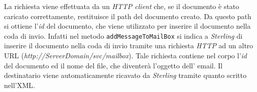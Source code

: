 La richiesta viene effettuata da un \textit{HTTP client} che, se il documento è stato caricato correttamente, restituisce il path del documento creato.
Da questo path si ottiene l'\textit{id} del documento, che viene utilizzato per inserire il documento nella coda di invio.
Infatti nel metodo \texttt{addMessageToMailBox} si indica a \textit{Sterling} di inserire il documento nella coda di invio tramite una richiesta \textit{HTTP}
ad un altro URL (\textit{http://ServerDomain/svc/mailbox}).
Tale richiesta contiene nel corpo l'\textit{id} del documento ed il nome del file, che diventerà l'oggetto dell' email.
Il destinatario viene automaticamente ricavato da \textit{Sterling} tramite quanto scritto nell'XML.

